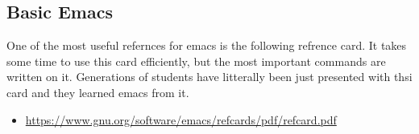 \begin{sphinxVerbatim}[commandchars=\\\{\}]
      
      
    
         
      
    
    
    
    
    
      
    
    
\end{sphinxVerbatim}


\subsection{Basic Emacs}
\label{\detokenize{lesson/doc/emacs::doc}}\label{\detokenize{lesson/doc/emacs:basic-emacs}}
One of the most useful refernces for emacs is the following refrence
card. It takes some time to use this card efficiently, but the most
important commands are written on it. Generations of students have
litterally been just presented with thsi card and they learned emacs
from it.
\begin{itemize}
\item {} 
\url{https://www.gnu.org/software/emacs/refcards/pdf/refcard.pdf}

\end{itemize}

